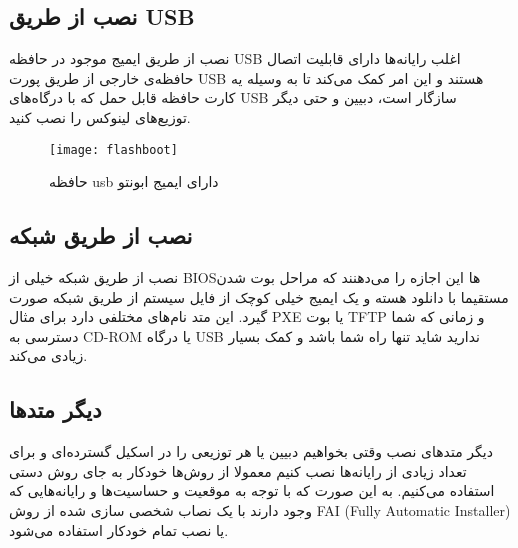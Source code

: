\subsection{نصب از طریق USB}
\begin{frame}{نصب از طریق ایمیج موجود در حافظه USB}
  اغلب رایانه‌ها دارای قابلیت اتصال حافظه‌ی خارجی از طریق پورت USB هستند و این امر کمک می‌کند تا به وسیله یه کارت حافظه قابل حمل که با درگاه‌های USB سازگار است، دبیین و حتی دیگر توزیع‌های لینوکس را نصب کنید.
\begin{figure}
  \centering
  \texttt{[image: flashboot]}
  \caption{حافظه usb دارای ایمیج ابونتو~\cite{fig:usb_bootable}}
\end{figure}
\end{frame}
\subsection{نصب از طریق شبکه}
\begin{frame}{نصب از طریق شبکه}
  خیلی از BIOS‌ها این اجازه را می‌دهنند که مراحل بوت شدن مستقیما با دانلود هسته و یک ایمیج خیلی کوچک از فایل سیستم‌ از طریق شبکه صورت گیرد.
  این متد نام‌های مختلفی دارد برای مثال PXE یا بوت TFTP و زمانی که شما دسترسی به CD-ROM یا درگاه USB ندارید شاید تنها راه شما باشد و کمک بسیار زیادی می‌کند.\\
\end{frame}
\subsection{دیگر متدها}
\begin{frame}{دیگر متدهای نصب}
  وقتی بخواهیم دبیین یا هر توزیعی را در اسکیل گسترده‌ای و برای تعداد زیادی از رایانه‌ها نصب کنیم  معمولا از روش‌ها خودکار به جای روش دستی استفاده می‌کنیم.
به این صورت که با توجه به موقعیت و حساسیت‌ها و رایانه‌هایی که وجود دارند با یک نصاب شخصی سازی شده از روش FAI (Fully Automatic Installer) یا نصب تمام خودکار استفاده می‌شود.
\end{frame}

